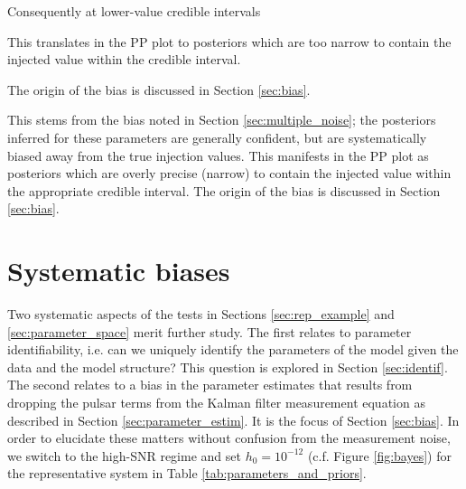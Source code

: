 \documentclass[fleqn,usenatbib,useAMS]{mnras}
\begin{document}
 Consequently at lower-value credible intervals  
 
 
 This translates in the PP plot to posteriors which are too narrow to contain the injected value within the credible interval. 
 
 The origin of the bias is discussed in Section \ref{sec:bias}. 
 
 
 
 
 
 
 
 
 This stems from the bias noted in Section \ref{sec:multiple_noise}; the posteriors inferred for these parameters are generally confident, but are systematically biased away from the true injection values. This manifests in the PP plot as posteriors which are overly precise (narrow) to contain the injected value within the appropriate credible interval. The origin of the bias is discussed in Section \ref{sec:bias}. 

\section{Systematic biases} \label{sec:bias_and_identifiability}
 Two systematic aspects of the tests in Sections \ref{sec:rep_example} and \ref{sec:parameter_space} merit further study. The first relates to parameter identifiability, i.e. can we uniquely identify the parameters of the model given the data and the model structure? This question is explored in Section \ref{sec:identif}. The second relates to a bias in the parameter estimates that results from dropping the pulsar terms from the Kalman filter measurement equation as described in Section \ref{sec:parameter_estim}. It is the focus of Section \ref{sec:bias}. In order to elucidate these matters without confusion from the measurement noise, we switch to the high-SNR regime and set $h_0 = 10^{-12}$ (c.f. Figure \ref{fig:bayes}) for the representative system in Table \ref{tab:parameters_and_priors}.
\end{document}
